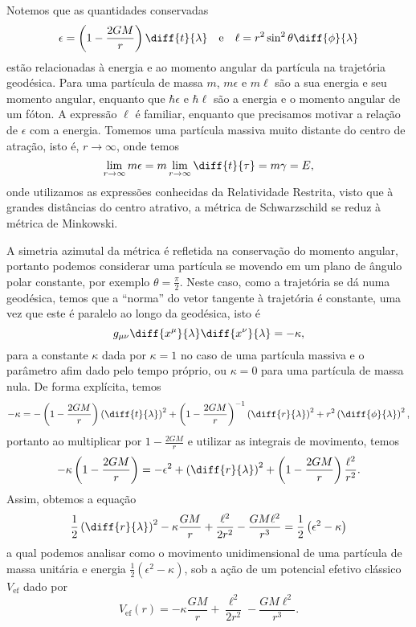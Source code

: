 Notemos que as quantidades conservadas
\begin{equation*}
    \epsilon = \left(1 - \frac{2GM}{r}\right)\diff{t}{\lambda}\quad\text{e}\quad \ell = r^2\sin^2\theta \diff{\phi}{\lambda}
\end{equation*}
estão relacionadas à energia e ao momento angular da partícula na trajetória geodésica. Para uma partícula de massa \(m\), \(m \epsilon\) e \( m \ell\) são a sua energia e seu momento angular, enquanto que \(\hbar \epsilon\) e \(\hbar \ell\) são a energia e o momento angular de um fóton. A expressão \(\ell\) é familiar, enquanto que precisamos motivar a relação de \(\epsilon\) com a energia. Tomemos uma partícula massiva muito distante do centro de atração, isto é, \(r \to \infty\), onde temos
\begin{equation*}
    \lim_{r\to\infty} m\epsilon = m \lim_{r\to \infty} \diff{t}{\tau} = m \gamma = E,
\end{equation*}
onde utilizamos as expressões conhecidas da Relatividade Restrita, visto que à grandes distâncias do centro atrativo, a métrica de Schwarzschild se reduz à métrica de Minkowski.

A simetria azimutal da métrica é refletida na conservação do momento angular, portanto podemos considerar uma partícula se movendo em um plano de ângulo polar constante, por exemplo \(\theta = \frac{\pi}{2}\). Neste caso, como a trajetória se dá numa geodésica, temos que a \enquote{norma} do vetor tangente à trajetória é constante, uma vez que este é paralelo ao longo da geodésica, isto é
\begin{equation*}
    g_{\mu\nu}\diff{x^\mu}{\lambda} \diff{x^\nu}{\lambda} = -\kappa,
\end{equation*}
para a constante \(\kappa\) dada por \(\kappa = 1\) no caso de uma partícula massiva e o parâmetro afim dado pelo tempo próprio, ou \(\kappa = 0\) para uma partícula de massa nula. De forma explícita, temos
\begin{equation*}
    -\kappa = -\left(1 - \frac{2GM}{r}\right)\left(\diff{t}{\lambda}\right)^2 + \left(1 - \frac{2GM}{r}\right)^{-1}\left(\diff{r}{\lambda}\right)^2 + r^2\left(\diff{\phi}{\lambda}\right)^2,
\end{equation*}
portanto ao multiplicar por \(1 - \frac{2GM}{r}\) e utilizar as integrais de movimento, temos
\begin{equation*}
    -\kappa\left(1 - \frac{2GM}{r}\right) = - \epsilon^2 + \left(\diff{r}{\lambda}\right)^2 + \left(1 - \frac{2GM}{r}\right)\frac{\ell^2}{r^2}.
\end{equation*}
Assim, obtemos a equação
\begin{equation*}
    \frac12\left(\diff{r}{\lambda}\right)^2 - \kappa \frac{GM}{r} + \frac{\ell^2}{2r^2} - \frac{GM\ell^2}{r^3} = \frac12 \left(\epsilon^2 - \kappa\right)
\end{equation*}
a qual podemos analisar como o movimento unidimensional de uma partícula de massa unitária  e energia \(\frac12 \left(\epsilon^2 - \kappa\right)\), sob a ação de um potencial efetivo clássico \(V_\mathrm{ef}\) dado por
\begin{equation*}
    V_\mathrm{ef}(r) = - \kappa \frac{GM}{r} + \frac{\ell^2}{2r^2} - \frac{GM\ell^2}{r^3}.
\end{equation*}
